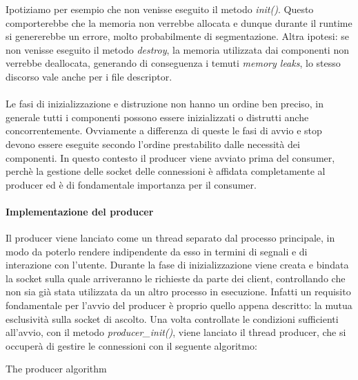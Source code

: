 \documentclass[]{article}
\begin{document}
Ipotiziamo per esempio che non venisse eseguito il metodo \textit{init()}.
Questo comporterebbe che la memoria non verrebbe allocata 
e dunque durante il runtime si genererebbe un errore, molto probabilmente
di segmentazione.
Altra ipotesi: se non venisse eseguito il metodo \textit{destroy},
la memoria utilizzata dai componenti non verrebbe deallocata,
generando di conseguenza i temuti \textit{memory leaks}, lo stesso discorso
vale anche per i file descriptor.
\\
\\
Le fasi di inizializzazione e distruzione non hanno un ordine ben preciso,
in generale tutti i componenti possono essere inizializzati o distrutti
anche concorrentemente. Ovviamente a differenza di queste le fasi
di avvio e stop devono essere eseguite secondo l'ordine prestabilito
dalle necessit\`a dei componenti.
In questo contesto il producer viene avviato prima del consumer, perch\`e
la gestione delle socket delle connessioni \`e affidata completamente al
producer ed \`e di fondamentale importanza per il consumer.

\paragraph{Implementazione del producer}
Il producer viene lanciato come un thread separato dal processo principale,
in modo da poterlo rendere indipendente da esso in termini di segnali e di interazione con l'utente.
Durante la fase di inizializzazione viene creata e bindata la socket sulla quale
arriveranno le richieste da parte dei client, controllando che non sia gi\`a stata
utilizzata da un altro processo in esecuzione.
Infatti un requisito fondamentale per l'avvio del producer \`e proprio quello appena descritto: la mutua esclusivit\`a sulla socket di ascolto.
Una volta controllate le condizioni sufficienti all'avvio, con il  metodo \textit{producer\_init()}, viene lanciato il thread producer,
che si occuper\`a di gestire le connessioni con il seguente algoritmo:

\begin{algorithm}[H] 
	\caption{The producer algorithm}
\end{algorithm}
\end{document}
